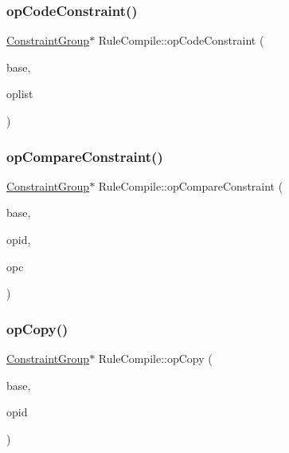 \mbox{\label{class_rule_compile_a5c0c4bcdc62212e9125fbaf7ce2601f9}} 
\subsubsection{\texorpdfstring{opCodeConstraint()}{opCodeConstraint()}}
{\footnotesize\ttfamily \mbox{\hyperlink{class_constraint_group}{Constraint\+Group}}$\ast$ Rule\+Compile\+::op\+Code\+Constraint (\begin{DoxyParamCaption}\item[{\mbox{\hyperlink{class_constraint_group}{Constraint\+Group}} $\ast$}]{base,  }\item[{vector$<$ \mbox{\hyperlink{opcodes_8hh_abeb7dfb0e9e2b3114e240a405d046ea7}{Op\+Code}} $>$ $\ast$}]{oplist }\end{DoxyParamCaption})}

\mbox{\label{class_rule_compile_a6faf8d2d0465b5ef1ffb6d2542a0761e}} 
\subsubsection{\texorpdfstring{opCompareConstraint()}{opCompareConstraint()}}
{\footnotesize\ttfamily \mbox{\hyperlink{class_constraint_group}{Constraint\+Group}}$\ast$ Rule\+Compile\+::op\+Compare\+Constraint (\begin{DoxyParamCaption}\item[{\mbox{\hyperlink{class_constraint_group}{Constraint\+Group}} $\ast$}]{base,  }\item[{int4}]{opid,  }\item[{\mbox{\hyperlink{opcodes_8hh_abeb7dfb0e9e2b3114e240a405d046ea7}{Op\+Code}}}]{opc }\end{DoxyParamCaption})}

\mbox{\label{class_rule_compile_ae37bf9b34cbade3a2575269cc020ac95}} 
\subsubsection{\texorpdfstring{opCopy()}{opCopy()}}
{\footnotesize\ttfamily \mbox{\hyperlink{class_constraint_group}{Constraint\+Group}}$\ast$ Rule\+Compile\+::op\+Copy (\begin{DoxyParamCaption}\item[{\mbox{\hyperlink{class_constraint_group}{Constraint\+Group}} $\ast$}]{base,  }\item[{int4}]{opid }\end{DoxyParamCaption})}

